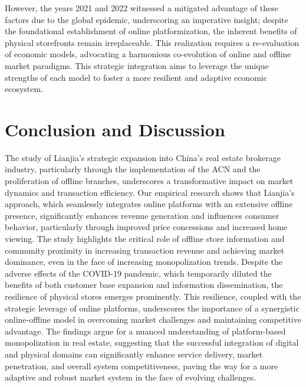 \documentclass[12pt]{article}
\begin{document}
However, the years 2021 and 2022 witnessed a mitigated advantage of these factors due to the global epidemic, underscoring an imperative insight; despite the foundational establishment of online platformization, the inherent benefits of physical storefronts remain irreplaceable. This realization requires a re-evaluation of economic models, advocating a harmonious co-evolution of online and offline market paradigms. This strategic integration aims to leverage the unique strengths of each model to foster a more resilient and adaptive economic ecosystem.

\section{Conclusion and Discussion} \label{sec:conclusion}




The study of Lianjia's strategic expansion into China's real estate brokerage industry, particularly through the implementation of the ACN and the proliferation of offline branches, underscores a transformative impact on market dynamics and transaction efficiency. Our empirical research shows that Lianjia's approach, which seamlessly integrates online platforms with an extensive offline presence, significantly enhances revenue generation and influences consumer behavior, particularly through improved price concessions and increased home viewing. The study highlights the critical role of offline store information and community proximity in increasing transaction revenue and achieving market dominance, even in the face of increasing monopolization trends. Despite the adverse effects of the COVID-19 pandemic, which temporarily diluted the benefits of both customer base expansion and information dissemination, the resilience of physical stores emerges prominently. This resilience, coupled with the strategic leverage of online platforms, underscores the importance of a synergistic online-offline model in overcoming market challenges and maintaining competitive advantage. The findings argue for a nuanced understanding of platform-based monopolization in real estate, suggesting that the successful integration of digital and physical domains can significantly enhance service delivery, market penetration, and overall system competitiveness, paving the way for a more adaptive and robust market system in the face of evolving challenges.

\clearpage
\begin{singlespace}
%
%


\end{singlespace}
\end{document}

